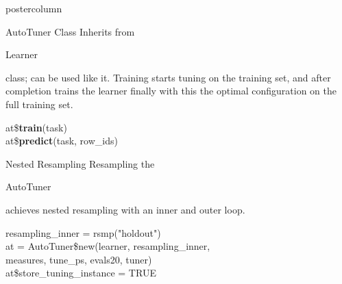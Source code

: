 \documentclass{beamer}
\newcommand{\codeinline}[1]{\begin{codeboxinline}#1\end{codeboxinline}}
\begin{document}
\begin{frame}[fragile]{}
\begin{columns}
\begin{column}{.245\textwidth}
\begin{beamercolorbox}[center]{postercolumn}
\begin{minipage}{.98\textwidth}
{\begin{myblock}{AutoTuner Class}
							\vspace{1em}
                            Inherits from \codeinline{Learner} class; can be used like it. Training starts tuning on the training set, and after completion trains the learner finally with this the optimal configuration on the full training set.
							\begin{codeboxmultiline}[width=16.5cm]
								at\$\textbf{train}(task)\\
								at\$\textbf{predict}(task, row\_ids)
							\end{codeboxmultiline}
						\end{myblock}
						\begin{myblock}{Nested Resampling}
							Resampling the \codeinline{AutoTuner} achieves nested resampling with an inner and outer loop. 
							\\
							\begin{codeboxexample}
								\scriptsize{
									resampling\_inner = rsmp("holdout")
									\vspace{1em}
									\\
									at = AutoTuner\$new(learner, resampling\_inner, \\
									\hspace*{1ex}measures, tune\_ps, evals20, tuner) \\
									at\$store\_tuning\_instance = TRUE
									\vspace{1em}
}
\end{codeboxexample}
\end{myblock}}
\end{minipage}
\end{beamercolorbox}
\end{column}
\end{columns}
\end{frame}
\end{document}
